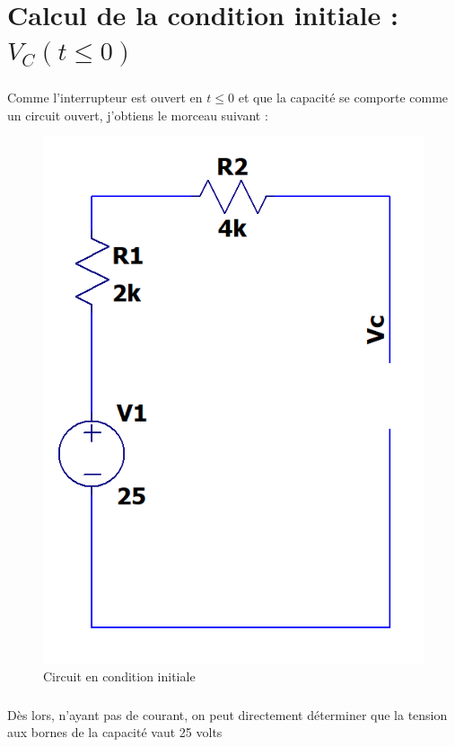     \section{Calcul de la condition initiale : $V_C(t\leq0)$}

    \subparagraph{}Comme l'interrupteur est ouvert en $t\leq0$ et que la capacité se comporte comme un circuit ouvert, j'obtiens le morceau suivant :
    
        \begin{figure}[H]
            \centering
            \includegraphics[scale=0.5]{../pictures/open.PNG}
            \caption{Circuit en condition initiale}
        \end{figure}
        
        
    \subparagraph{} Dès lors, n'ayant pas de courant, on peut directement déterminer que la tension aux bornes de la capacité vaut 25 volts
    
